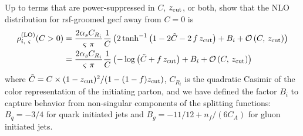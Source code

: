 \begin{exercise}
    \label{ex:rsf-gecf}
    Up to terms that are power-suppressed in \(C\), \(z_{\rm cut}\), or both, show that the NLO distribution for \gls{rsf}-groomed \gls{gecf} away from \(C = 0\) is
    \label{eq:prsf_LO}
    \begin{align}
        \rho^{\rm(LO)}_{i,~\varsigma}(C>0)
        &=
        \frac{2\alpha_s C_{R_i}}{\varsigma~\pi}
        \frac{1}{C}
        \left(
            2\tanh^{-1}\left(1  -2 \tilde C - 2\,f\,z_{\rm cut}\right)
            + B_i
            +
            \mathcal{O}\left(C,\,z_{\rm cut}\right)
        \right)
        \\
        &=
        \frac{2\alpha_s C_{R_i}}{\varsigma~\pi}
        \frac{1}{C}
        \left(
            -\log\left(\tilde C + f\,z_{\rm cut}\right)
            + B_i
            +
            \mathcal{O}\left(C,\,z_{\rm cut}\right)
        \right)
    \end{align}
    where \(\tilde C = C \times (1-z_{\rm cut})^2 / (1 - (1-f)z_{\rm cut})\), \(C_{R_i}\) is the quadratic Casimir of the color representation of the initiating parton, and we have defined the factor \(B_i\) to capture behavior from non-singular components of the splitting functions:
    \(B_q = -3/4\) for quark initiated jets and \(B_g = -11/12 + n_f/(6 C_A)\) for gluon initiated jets.
\end{exercise}

